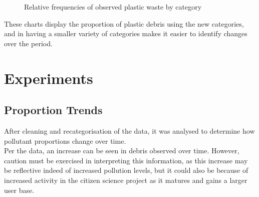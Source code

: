\documentclass[10pt]{article}\usepackage[]{graphicx}\usepackage[]{color}
\newenvironment{knitrout}{}{} %
\begin{document}
\begin{figure}[H]
\begin{center}
\begin{knitrout}
\end{knitrout}
\caption {Relative frequencies of observed plastic waste by category}
\label{figB}
\end {center}
\end {figure}


These charts display the proportion of plastic debris using the new categories, and in having a smaller variety of categories makes it easier to identify changes over the period.















\pagebreak
\section{Experiments}



\subsection{Proportion Trends}
After cleaning and recategorisation of the data, it was analysed to determine how pollutant proportions change over time.\\



Per the data, an increase can be seen in debris observed over time. However, caution must be exercised in interpreting this information, as this increase may be reflective indeed of increased pollution levels, but it could also be because of increased activity in the citizen science project as it matures and gains a larger user base.\\
\end{document}
